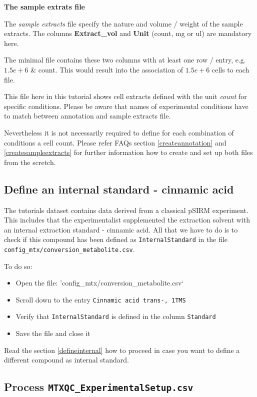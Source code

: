 \documentclass[]{book}
\providecommand{\tightlist}{%
  \setlength{\itemsep}{0pt}\setlength{\parskip}{0pt}}
\theoremstyle{definition}
\theoremstyle{definition}
\theoremstyle{definition}
\theoremstyle{remark}
\begin{document}
\textbf{The sample extrats file}

The \emph{sample extracts} file specify the nature and volume / weight
of the sample extracts. The columns \textbf{Extract\_vol} and
\textbf{Unit} (count, mg or ul) are mandatory here.

The minimal file contains these two columns with at least one row /
entry, e.g. \(1.5e+6\) \& count. This would result into the association
of \(1.5e+6\) cells to each file.

This file here in this tutorial shows cell extracts defined with the
unit \emph{count} for specific conditions. Please be aware that names of
experimental conditions have to match between annotation and sample
extracts file.

Nevertheless it is not necessarily required to define for each
combination of conditions a cell count. Please refer FAQs section
\ref{createannotation} and \ref{createsampleextracts} for further
information how to create and set up both files from the scretch.

\subsection{Define an internal standard - cinnamic
acid}\label{define-an-internal-standard---cinnamic-acid}

The tutorials dataset contains data derived from a classical pSIRM
experiment. This includes that the experimentalist supplemented the
extraction solvent with an internal extraction standard - cinnamic acid.
All that we have to do is to check if this compound has been defined as
\texttt{InternalStandard} in the file
\texttt{config\_mtx/conversion\_metabolite.csv}.

To do so:

\begin{itemize}
\tightlist
\item
  Open the file: 'config\_mtx/conversion\_metabolite.csv`
\item
  Scroll down to the entry \texttt{Cinnamic\ acid\ trans-,\ 1TMS}
\item
  Verify that \texttt{InternalStandard} is defined in the column
  \texttt{Standard}
\item
  Save the file and close it
\end{itemize}

Read the section \ref{defineinternal} how to proceed in case you want to
define a different compound as internal standard.

\subsection{\texorpdfstring{Process
\texttt{MTXQC\_ExperimentalSetup.csv}}{Process MTXQC\_ExperimentalSetup.csv}}\label{process-mtxqc_experimentalsetup.csv}
\end{document}
